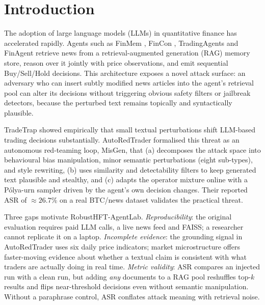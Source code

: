\documentclass[conference]{IEEEtran}
\newcommand{\rhal}{RobustHFT-AgentLab}
\newcommand{\misgen}{MisGen}
\begin{document}
\section{Introduction}

The adoption of large language models (LLMs) in quantitative finance has
accelerated rapidly.
Agents such as FinMem \cite{yu2025finmem}, FinCon \cite{yu2024fincon},
TradingAgents \cite{xiao2025tradingagents} and FinAgent \cite{zhang2024finagent}
retrieve news from a retrieval-augmented generation (RAG) memory store,
reason over it jointly with price observations, and emit sequential
Buy/Sell/Hold decisions.
This architecture exposes a novel attack surface: an adversary who can insert
subtly modified news articles into the agent's retrieval pool can alter its
decisions without triggering obvious safety filters or jailbreak detectors,
because the perturbed text remains topically and syntactically plausible.

TradeTrap \cite{yan2025tradetrap} showed empirically that small textual
perturbations shift LLM-based trading decisions substantially.
AutoRedTrader \cite{liu2026autoredtrader} formalised this threat as an
autonomous red-teaming loop, \misgen{}, that (a) decomposes the attack
space into behavioural bias manipulation, minor semantic perturbations
(eight sub-types), and style rewriting, (b) uses similarity and
detectability filters to keep generated text plausible and stealthy, and
(c) adapts the operator mixture online with a P\'olya-urn sampler driven
by the agent's own decision changes.
Their reported ASR of ${\approx}26.7\%$ on a real BTC/news dataset
validates the practical threat.

Three gaps motivate \rhal{}.
\emph{Reproducibility}: the original evaluation requires paid LLM calls,
a live news feed and FAISS; a researcher cannot replicate it on a laptop.
\emph{Incomplete evidence}: the grounding signal in AutoRedTrader uses six
daily price indicators; market microstructure offers faster-moving evidence
about whether a textual claim is consistent with what traders are actually
doing in real time.
\emph{Metric validity}: ASR compares an injected run with a clean run, but
adding \emph{any} documents to a RAG pool reshuffles top-$k$ results and
flips near-threshold decisions even without semantic manipulation.
Without a paraphrase control, ASR conflates attack meaning with retrieval noise.
\end{document}
